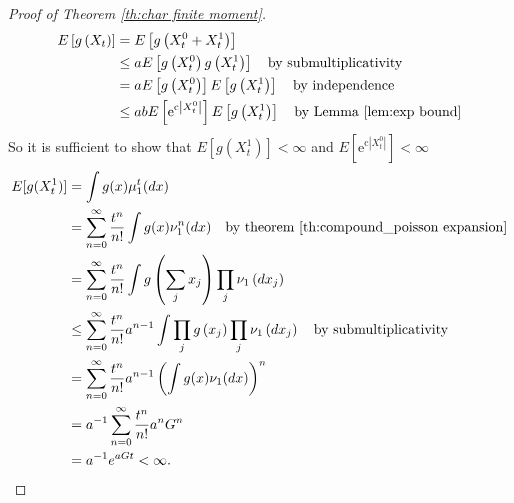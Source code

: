 \documentclass[a4paper,11pt]{article}
\begin{document}
\begin{proof}[Proof of Theorem \ref{th:char finite moment}]
    \begin{align}
        E\left[g\left(X_{t}\right)\right] & =  E\left[g\left(X_{t}^{0} + X_{t}^{1}\right)\right]                                                                                                \\
                                          & \leq aE\left[ g\left(X_{t}^{0}\right) g\left(X_{t}^{1}\right)\right]       \quad \text{by submultiplicativity}                                      \\
                                          & = aE\left[ g\left(X_{t}^{0}\right)\right]  E\left[ g\left(X_{t}^{1}\right)\right]   \quad \text{by independence}                                    \\
                                          & \le a b E\left[\mathrm{e}^{\mathrm{c}\left|X_{t}^{0}\right|}\right] E\left[g\left(X_{t}^{1}\right)\right] \quad \text{by Lemma \ref{lem:exp bound}}
    \end{align}
    So it is sufficient to show that $E\left[g\left(X_{t}^{1}\right) \right]<\infty$ and
    $E\left[\mathrm{e}^{\mathrm{c}\left|X_{t}^{0}\right|}\right] < \infty$
    \begin{align}
        E[g(X^{1}_{t})] & = \int g(x) \mu _{1} ^{t}(dx)                                                                                                                                   \\
                        & =\sum_{n=0}^{\infty} \frac{t^{n}}{n !} \int g(x) \nu_{1}^{n}(dx)                 \quad \text{by theorem \ref{th:compound_poisson expansion}}                    \\
                        & =\sum_{n=0}^{\infty} \frac{t^{n}}{n !} \int g\left(\sum_{j} x_{j}\right) \prod_{j}\nu_{1}\left(dx_{j}\right)                                                    \\
                        & \le \sum_{n=0}^{\infty} \frac{t^{n}}{n !} a^{n-1}\int \prod_{j} g\left(x_{j}\right) \prod_{j} \nu_{1}\left(dx_{j}\right)    \quad \text{by submultiplicativity} \\
                        & =\sum_{n=0}^{\infty} \frac{t^{n}}{n !} a^{n-1} \left(\int g(x) \nu_{1}(dx)\right)^{n}                                                                           \\
                        & =a^{-1}\sum_{n=0}^{\infty} \frac{t^{n}}{n !} a^{n} G^{n}                                                                                                        \\
                        & = a^{-1} e^{aGt} < \infty.
    \end{align}


\end{proof}
\end{document}
